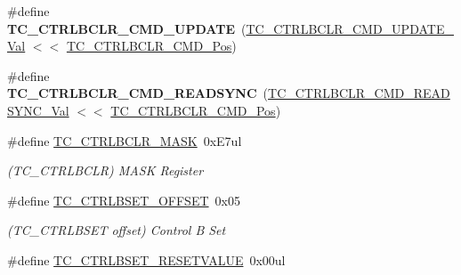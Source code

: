 \begin{DoxyCompactItemize}
\item 
\hypertarget{group___s_a_m_l21___t_c_ga3bd46450a15e39a7588180bf10c52338}{}\#define {\bfseries T\+C\+\_\+\+C\+T\+R\+L\+B\+C\+L\+R\+\_\+\+C\+M\+D\+\_\+\+U\+P\+D\+A\+T\+E}~(\hyperlink{group___s_a_m_l21___t_c_ga95411bb7c71688976ba81dfd9769528d}{T\+C\+\_\+\+C\+T\+R\+L\+B\+C\+L\+R\+\_\+\+C\+M\+D\+\_\+\+U\+P\+D\+A\+T\+E\+\_\+\+Val}    $<$$<$ \hyperlink{group___s_a_m_l21___t_c_gab48aaea729baf61fabeb52131fb7aac2}{T\+C\+\_\+\+C\+T\+R\+L\+B\+C\+L\+R\+\_\+\+C\+M\+D\+\_\+\+Pos})\label{group___s_a_m_l21___t_c_ga3bd46450a15e39a7588180bf10c52338}

\item 
\hypertarget{group___s_a_m_l21___t_c_gaadfdc74b2166ebbafd6b71c20d85c8e5}{}\#define {\bfseries T\+C\+\_\+\+C\+T\+R\+L\+B\+C\+L\+R\+\_\+\+C\+M\+D\+\_\+\+R\+E\+A\+D\+S\+Y\+N\+C}~(\hyperlink{group___s_a_m_l21___t_c_gac21e1409aca7821d2dbe2d030d874006}{T\+C\+\_\+\+C\+T\+R\+L\+B\+C\+L\+R\+\_\+\+C\+M\+D\+\_\+\+R\+E\+A\+D\+S\+Y\+N\+C\+\_\+\+Val}  $<$$<$ \hyperlink{group___s_a_m_l21___t_c_gab48aaea729baf61fabeb52131fb7aac2}{T\+C\+\_\+\+C\+T\+R\+L\+B\+C\+L\+R\+\_\+\+C\+M\+D\+\_\+\+Pos})\label{group___s_a_m_l21___t_c_gaadfdc74b2166ebbafd6b71c20d85c8e5}

\item 
\hypertarget{group___s_a_m_l21___t_c_ga655c3fd9b9c849e6058a92d05529ebe7}{}\#define \hyperlink{group___s_a_m_l21___t_c_ga655c3fd9b9c849e6058a92d05529ebe7}{T\+C\+\_\+\+C\+T\+R\+L\+B\+C\+L\+R\+\_\+\+M\+A\+S\+K}~0x\+E7ul\label{group___s_a_m_l21___t_c_ga655c3fd9b9c849e6058a92d05529ebe7}

\begin{DoxyCompactList}\small\item\em (T\+C\+\_\+\+C\+T\+R\+L\+B\+C\+L\+R) M\+A\+S\+K Register \end{DoxyCompactList}\item 
\hypertarget{group___s_a_m_l21___t_c_ga7fab832c57aa9747088c91a74a1c4059}{}\#define \hyperlink{group___s_a_m_l21___t_c_ga7fab832c57aa9747088c91a74a1c4059}{T\+C\+\_\+\+C\+T\+R\+L\+B\+S\+E\+T\+\_\+\+O\+F\+F\+S\+E\+T}~0x05\label{group___s_a_m_l21___t_c_ga7fab832c57aa9747088c91a74a1c4059}

\begin{DoxyCompactList}\small\item\em (T\+C\+\_\+\+C\+T\+R\+L\+B\+S\+E\+T offset) Control B Set \end{DoxyCompactList}\item 
\hypertarget{group___s_a_m_l21___t_c_gae3d25e981a13f6ff94217281797aa79b}{}\#define \hyperlink{group___s_a_m_l21___t_c_gae3d25e981a13f6ff94217281797aa79b}{T\+C\+\_\+\+C\+T\+R\+L\+B\+S\+E\+T\+\_\+\+R\+E\+S\+E\+T\+V\+A\+L\+U\+E}~0x00ul\label{group___s_a_m_l21___t_c_gae3d25e981a13f6ff94217281797aa79b}


\end{DoxyCompactItemize}
